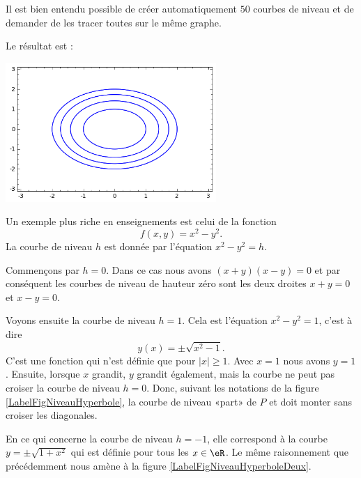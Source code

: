 Il est bien entendu possible de créer automatiquement $50$ courbes de niveau et de demander de les tracer toutes sur le même graphe.

Le résultat est :

\begin{center}
        \includegraphics[width=8cm]{pictures_bitmap/niveauCercles.png}
\end{center}

\begin{example}
    Un exemple plus riche en enseignements est celui de la fonction
    \begin{equation}
        f(x,y)=x^2-y^2.
    \end{equation}
    La courbe de niveau $h$ est donnée par l'équation $x^2-y^2=h$.

    Commençons par $h=0$. Dans ce cas nous avons $(x+y)(x-y)=0$ et par conséquent les courbes de niveau de hauteur zéro sont les deux droites $x+y=0$ et $x-y=0$.

    Voyons ensuite la courbe de niveau $h=1$. Cela est l'équation $x^2-y^2=1$, c'est à dire
    \begin{equation}
        y(x)=\pm\sqrt{x^2-1}.
    \end{equation}
    C'est une fonction qui n'est définie que pour $| x |\geq 1$. Avec $x=1$ nous avons $y=1$. Ensuite, lorsque $x$ grandit, $y$ grandit également, mais la courbe ne peut pas croiser la courbe de niveau $h=0$. Donc, suivant les notations de la figure \ref{LabelFigNiveauHyperbole}, la courbe de niveau «part» de $P$ et doit monter sans croiser les diagonales.

    \newcommand{\CaptionFigNiveauHyperbole}{La courbe de niveau $h=1$ de $x^2-y^2$. Notez qu'elle est en deux morceaux.}
    

    En ce qui concerne la courbe de niveau $h=-1$, elle correspond à la courbe $y=\pm\sqrt{1+x^2}$ qui est définie pour tous les $x\in\eR$. Le même raisonnement que précédemment nous amène à la figure \ref{LabelFigNiveauHyperboleDeux}.
\newcommand{\CaptionFigNiveauHyperboleDeux}{La courbe de niveau $x^2-y^2=-1$.}



\end{example}

